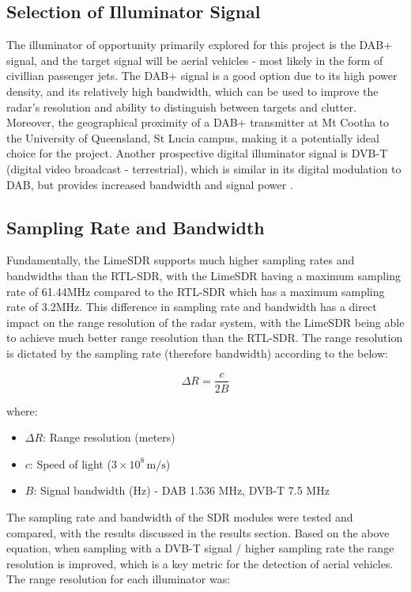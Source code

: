 \subsection{Selection of Illuminator Signal}
The illuminator of opportunity primarily explored for this project is the DAB+ signal, and the target signal will be aerial vehicles - most likely in the form of civillian passenger jets. The DAB+ signal is a good option due to its high power density, and its relatively high bandwidth, which can be used to improve the radar's resolution and ability to distinguish between targets and clutter. Moreover, the geographical proximity of a DAB+ transmitter at Mt Cootha to the University of Queensland, St Lucia campus, making it a potentially ideal choice for the project. Another prospective digital illuminator signal is DVB-T (digital video broadcast - terrestrial), which is similar in its digital modulation to DAB, but provides increased bandwidth and signal power \cite{DVBsignal}.

\subsection{Sampling Rate and Bandwidth}
Fundamentally, the LimeSDR supports much higher sampling rates and bandwidths than the RTL-SDR, with the LimeSDR having a maximum sampling rate of 61.44MHz compared to the RTL-SDR which has a maximum sampling rate of 3.2MHz. This difference in sampling rate and bandwidth has a direct impact on the range resolution of the radar system, with the LimeSDR being able to achieve much better range resolution than the RTL-SDR. The range resolution is dictated by the sampling rate (therefore bandwidth) according to the below:

\[
\Delta R = \frac{c}{2B}
\]

where:
\begin{itemize}
    \item \( \Delta R \): Range resolution (meters)
    \item \( c \): Speed of light (\(3 \times 10^8 \, \text{m/s}\))
    \item \( B \): Signal bandwidth (Hz) - DAB 1.536 MHz, DVB-T 7.5 MHz
\end{itemize}

The sampling rate and bandwidth of the SDR modules were tested and compared, with the results discussed in the results section. Based on the above equation, when sampling with a DVB-T signal / higher sampling rate the range resolution is improved, which is a key metric for the detection of aerial vehicles. The range resolution for each illuminator was:

